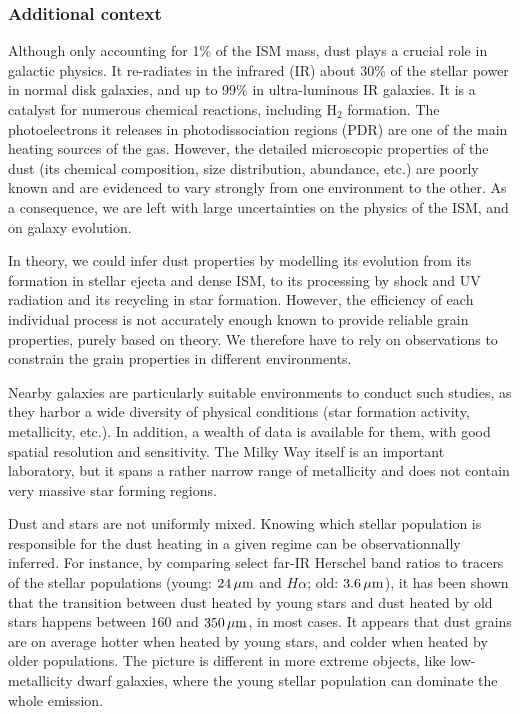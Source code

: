 \documentclass[a4paper,10pt]{article}
\begin{document}
\subsubsection{Additional context}

Although only accounting for 1\% of the ISM mass, dust plays a crucial role in galactic physics. It re-radiates in the infrared (IR) about 30\% of the stellar power in normal disk galaxies, and up to 99\% in ultra-luminous IR galaxies. It is a catalyst for numerous chemical reactions, including H$_2$ formation. The photoelectrons it releases in photodissociation regions (PDR) are one of the main heating sources of the gas. However, the detailed microscopic properties of the dust (its chemical composition, size distribution, abundance, etc.) are poorly known and are evidenced to vary strongly from one environment to the other. As a consequence, we are left with large uncertainties on the physics of the ISM, and on galaxy evolution.

{\noindent}In theory, we could infer dust properties by modelling its evolution from its formation in stellar ejecta and dense ISM, to its processing by shock and UV radiation and its recycling in star formation. However, the efficiency of each individual process is not accurately enough known to provide reliable grain properties, purely based on theory. We therefore have to rely on observations to constrain the grain properties in different environments.

{\noindent}Nearby galaxies are particularly suitable environments to conduct such studies, as they harbor a wide diversity of physical conditions (star formation activity, metallicity, etc.). In addition, a wealth of data is available for them, with good spatial resolution and sensitivity. The Milky Way itself is an important laboratory, but it spans a rather narrow range of metallicity and does not contain very massive star forming regions.

{\noindent}Dust and stars are not uniformly mixed. Knowing which stellar population is responsible for the dust heating in a given regime can be observationnally inferred. For instance, by comparing select far-IR Herschel band ratios to tracers of the stellar populations (young: $24\,\mu{\rm m}$ and $H\alpha$; old: $3.6\,\mu{\rm m}$), it has been shown that the transition between dust heated by young stars and dust heated by old stars happens between $160$ and $350\,\mu{\rm m}$, in most cases. It appears that dust grains are on average hotter when heated by young stars, and colder when heated by older populations. The picture is different in more extreme objects, like low-metallicity dwarf galaxies, where the young stellar population can dominate the whole emission.
\end{document}
